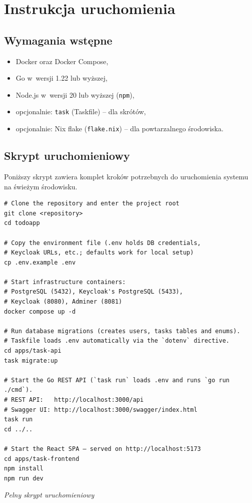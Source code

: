 \documentclass[12pt, a4paper, oneside]{article}
\newcommand{\codecaption}[1]{\par\vspace{-0.4em}\noindent\small\textit{#1}\par\vspace{0.3em}}
\begin{document}
\section{Instrukcja uruchomienia}

\subsection{Wymagania wstępne}
\begin{itemize}
  \item Docker oraz Docker Compose,
  \item Go w~wersji 1.22 lub wyższej,
  \item Node.js w~wersji 20 lub wyższej (\texttt{npm}),
  \item opcjonalnie: \texttt{task} (Taskfile) -- dla skrótów,
  \item opcjonalnie: Nix flake (\texttt{flake.nix}) -- dla powtarzalnego środowiska.
\end{itemize}

\subsection{Skrypt uruchomieniowy}
Poniższy skrypt zawiera komplet kroków potrzebnych do uruchomienia
systemu na świeżym środowisku.

\begin{verbatim}
# Clone the repository and enter the project root
git clone <repository>
cd todoapp

# Copy the environment file (.env holds DB credentials,
# Keycloak URLs, etc.; defaults work for local setup)
cp .env.example .env

# Start infrastructure containers:
# PostgreSQL (5432), Keycloak's PostgreSQL (5433),
# Keycloak (8080), Adminer (8081)
docker compose up -d

# Run database migrations (creates users, tasks tables and enums).
# Taskfile loads .env automatically via the `dotenv` directive.
cd apps/task-api
task migrate:up

# Start the Go REST API (`task run` loads .env and runs `go run ./cmd`).
# REST API:   http://localhost:3000/api
# Swagger UI: http://localhost:3000/swagger/index.html
task run
cd ../..

# Start the React SPA — served on http://localhost:5173
cd apps/task-frontend
npm install
npm run dev
\end{verbatim}
\codecaption{Pelny skrypt uruchomieniowy}
\end{document}

